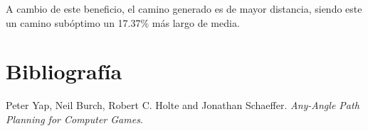\documentclass[11pt,spanish]{article} %
\begin{document}
A cambio de este beneficio, el camino generado es de mayor distancia, siendo este un camino subóptimo un 17.37\% más largo de media.

\section{Bibliografía}

\begin{thebibliography}{9}
Peter Yap, Neil Burch, Robert C. Holte and Jonathan Schaeffer.
\textit{Any-Angle Path Planning for Computer Games}.
\end{thebibliography}

\end{document}
